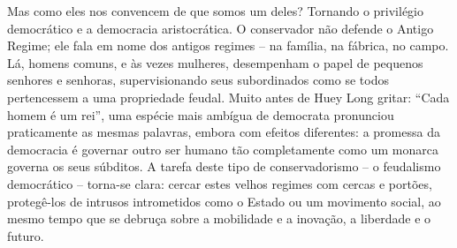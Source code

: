  
\par
 
Mas como eles nos convencem de que somos um deles? Tornando o privilégio democrático e a democracia aristocrática. O conservador não defende o Antigo Regime; ele fala em nome dos antigos regimes – na família, na fábrica, no campo. Lá, homens comuns, e às vezes mulheres, desempenham o papel de pequenos senhores e senhoras, supervisionando seus subordinados como se todos pertencessem a uma propriedade feudal. Muito antes de Huey Long gritar: “Cada homem é um rei”, uma espécie mais ambígua de democrata pronunciou praticamente as mesmas palavras, embora com efeitos diferentes: a promessa da democracia é governar outro ser humano tão completamente como um monarca governa os seus súbditos. A tarefa deste tipo de conservadorismo – o feudalismo democrático – torna-se clara: cercar estes velhos regimes com cercas e portões, protegê-los de intrusos intrometidos como o Estado ou um movimento social, ao mesmo tempo que se debruça sobre a mobilidade e a inovação, a liberdade e o futuro.
 
\par
 
